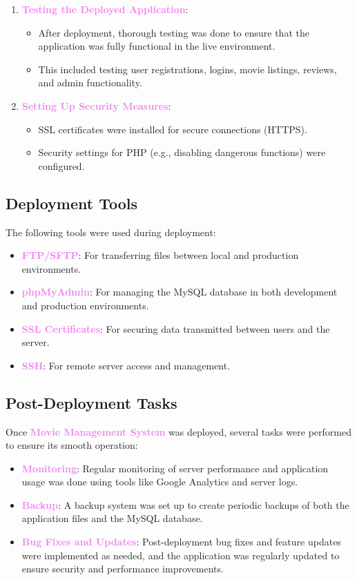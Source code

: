 \documentclass[a4paper,12pt]{article}  %
\renewcommand{\textbf}[1]{\textcolor{violet}{\bfseries #1}}
\begin{document}
\begin{enumerate}
    \item \textbf{Testing the Deployed Application}:
    \begin{itemize}
        \item After deployment, thorough testing was done to ensure that the application was fully functional in the live environment.
        \item This included testing user registrations, logins, movie listings, reviews, and admin functionality.
    \end{itemize}
    
    \item \textbf{Setting Up Security Measures}:
    \begin{itemize}
        \item SSL certificates were installed for secure connections (HTTPS).
        \item Security settings for PHP (e.g., disabling dangerous functions) were configured.
    \end{itemize}
\end{enumerate}

\subsection{Deployment Tools}
The following tools were used during deployment:
\begin{itemize}
    \item \textbf{FTP/SFTP}: For transferring files between local and production environments.
    \item \textbf{phpMyAdmin}: For managing the MySQL database in both development and production environments.
    \item \textbf{SSL Certificates}: For securing data transmitted between users and the server.
    \item \textbf{SSH}: For remote server access and management.
\end{itemize}

\subsection{Post-Deployment Tasks}
Once \textbf{Movie Management System} was deployed, several tasks were performed to ensure its smooth operation:
\begin{itemize}
    \item \textbf{Monitoring}: Regular monitoring of server performance and application usage was done using tools like Google Analytics and server logs.
    \item \textbf{Backup}: A backup system was set up to create periodic backups of both the application files and the MySQL database.
    \item \textbf{Bug Fixes and Updates}: Post-deployment bug fixes and feature updates were implemented as needed, and the application was regularly updated to ensure security and performance improvements.
\end{itemize}
\end{document}
